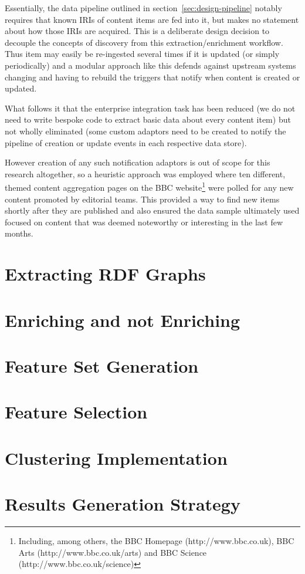 Essentially, the data pipeline outlined in
section~\ref{sec:design-pipeline} notably requires that known IRIs of
content items are fed into it, but makes no statement about how those
IRIs are acquired. This is a deliberate design decision to decouple
the concepts of discovery from this extraction/enrichment workflow.
Thus item may easily be re-ingested several times if it is updated
(or simply periodically) and
a modular approach like this defends against upstream systems changing
and having to rebuild the triggers that notify when content is created
or updated.

What follows it that the enterprise integration task has been reduced
(we do not need to write bespoke code to extract basic data about
every content item) but not wholly eliminated (some custom adaptors
need to be created to notify the pipeline of creation or update events
in each respective data store).

However creation of any such notification adaptors is out of scope
for this research altogether, so a heuristic approach was employed
where ten different, themed content aggregation pages on the BBC
website\footnote{
  Including, among others, the BBC Homepage (http://www.bbc.co.uk),
  BBC Arts (http://www.bbc.co.uk/arts) and BBC Science
  (http://www.bbc.co.uk/science)
} were polled for any new content promoted by editorial teams.
This provided a way to find new items shortly after they are published
and also ensured the data sample ultimately used focused on content
that was deemed noteworthy or interesting in the last few months.

\section{Extracting RDF Graphs}
\label{sec:impl-extraction}

\section{Enriching and not Enriching}

\section{Feature Set Generation}

\section{Feature Selection}

\section{Clustering Implementation}

\section{Results Generation Strategy}
